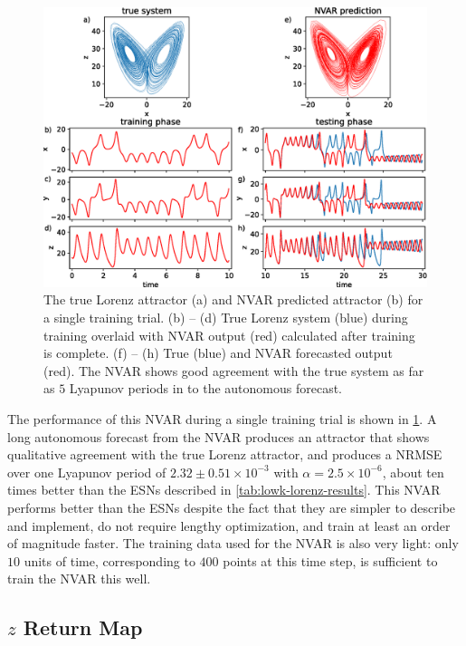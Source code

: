 \begin{figure}
  \includegraphics[width=\textwidth]{figures/nvar-predict-lorenz}
  \caption{The true Lorenz attractor (a) and NVAR predicted attractor
    (b) for a single training trial. (b) -- (d) True Lorenz system
    (blue) during training overlaid with NVAR output (red) calculated
    after training is complete. (f) -- (h) True (blue) and NVAR
    forecasted output (red). The NVAR shows good agreement with the
    true system as far as $5$ Lyapunov periods in to the autonomous
    forecast.}
  \label{fig:nvar-predict-lorenz}
\end{figure}

The performance of this NVAR during a single training trial is shown
in \cref{fig:nvar-predict-lorenz}. A long autonomous forecast from the
NVAR produces an attractor that shows qualitative agreement with the
true Lorenz attractor, and produces a NRMSE over one Lyapunov period
of $2.32\pm0.51\times10^{-3}$ with $\alpha = 2.5\times10^{-6}$, about
ten times better than the ESNs described in
\cref{tab:lowk-lorenz-results}. This NVAR performs better than the
ESNs despite the fact that they are simpler to describe and implement,
do not require lengthy optimization, and train at least an order of
magnitude faster. The training data used for the NVAR is also very
light: only $10$ units of time, corresponding to $400$ points at this
time step, is sufficient to train the NVAR this well.

\subsection{$z$ Return Map}

